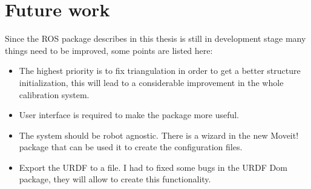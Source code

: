 \chapter{Future work}
\label{cha:future}

Since the ROS package describes in this thesis is still in development stage many things need to be improved, some points are listed here:

\begin{itemize}
 \item The highest priority is to fix triangulation in order to get a better structure initialization, this will lead to a considerable improvement in the whole calibration system.


 \item User interface is required to make the package more useful.

 \item The system should be robot agnostic. There is a wizard in the new Moveit! package that can be used it to create the configuration files.

 \item Export the URDF to a file. I had to fixed some bugs in the URDF Dom package, they will allow to create this functionality.

\end{itemize}
